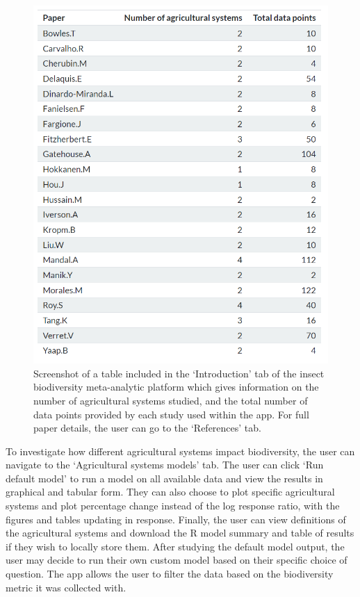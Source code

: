 \documentclass[11pt]{article}
\begin{document}
		\begin{figure}[H] 
			\centering 
			\includegraphics[scale=0.75]{figure_2_paper_details_table.png} 
			\caption{Screenshot of a table included in the ‘Introduction’ tab of the insect biodiversity meta-analytic platform which gives information on the number of agricultural systems studied, and the total number of data points provided by each study used within the app. For full paper details, the user can go to the ‘References’ tab.}  
		\end{figure}
		
		\noindent To investigate how different agricultural systems impact biodiversity, the user can navigate to the ‘Agricultural systems models’ tab. The user can click ‘Run default model’ to run a model on all available data and view the results in graphical and tabular form. They can also choose to plot specific agricultural systems and plot percentage change instead of the log response ratio, with the figures and tables updating in response. Finally, the user can view definitions of the agricultural systems and download the R model summary and table of results if they wish to locally store them. After studying the default model output, the user may decide to run their own custom model based on their specific choice of question. The app allows the user to filter the data based on the biodiversity metric it was collected with. 
		
\end{document}
